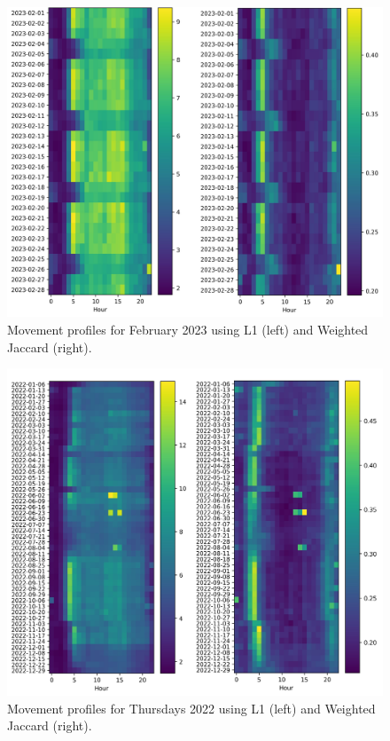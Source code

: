 \documentclass[../main.tex]{subfiles}
\begin{document}
\begin{figure}[ht]
\centering
\begin{adjustbox}{center}
\includegraphics[width=1.6\textwidth]{graphics/results/new_L1_Jaccard_Feb.png}
\end{adjustbox}
\caption{Movement profiles for February 2023 using L1 (left) and Weighted Jaccard (right).}
\label{fig:mov-pro-feb}
\end{figure}

\begin{figure}[ht]
\centering
\begin{adjustbox}{center}
\includegraphics[width=1.6\textwidth]{graphics/results/new_L1_Jaccard_Year.png}
\end{adjustbox}
\caption{Movement profiles for Thursdays 2022 using L1 (left) and Weighted Jaccard (right).}
\label{fig:full-mov-pro}
\end{figure}
\end{document}
